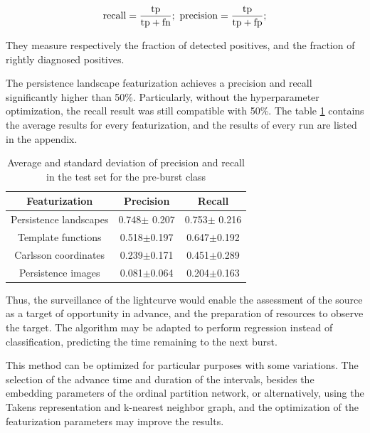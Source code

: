 \documentclass{article}
\begin{document}
\begin{equation}
    \label{eq3}
      \rm{recall}=\frac{\rm{tp}}{\rm{tp}+\rm{fn}} ;~ 
      \rm{precision}=\frac{\rm{tp}}{\rm{tp}+\rm{fp}};
\end{equation}





They measure respectively the fraction of detected positives, and the fraction of rightly diagnosed positives. 

The persistence landscape featurization achieves a precision and recall significantly higher than 50\%. Particularly, without the hyperparameter optimization, the recall result was still compatible with 50\%. The table \ref{precision-recall_standarddeviations_hyperparameterstuned} contains the average results for every featurization, and the results of every run are listed in the appendix.

\begin{table}[h!]
\caption{Average and standard deviation of precision and recall in the test set for the pre-burst class}                 %
\label{precision-recall_standarddeviations_hyperparameterstuned}    %
\centering                        %
\begin{tabular}{c|c|c}
Featurization	&Precision &Recall	\\
\hline\hline

Persistence landscapes	&0.748$\pm$ 0.207 &0.753$\pm$ 0.216 	 \\
Template functions	&0.518$\pm$0.197	&0.647$\pm$0.192	 \\
Carlsson coordinates	&0.239$\pm$0.171	&0.451$\pm$0.289	 \\
Persistence images	&0.081$\pm$0.064	&0.204$\pm$0.163	 \\


\end{tabular}
\end{table}
\FloatBarrier
Thus, the surveillance of the lightcurve would enable the assessment of the source as a target of opportunity in advance, and the preparation of resources to observe the target. The algorithm may be adapted to perform regression instead of classification, predicting the time remaining to the next burst.

This method can be optimized for particular purposes with some variations. The selection of the advance time and duration of the intervals, besides the embedding parameters of the ordinal partition network, or alternatively, using the Takens representation and k-nearest neighbor graph, and the optimization of the featurization parameters may improve the results. 
\end{document}
